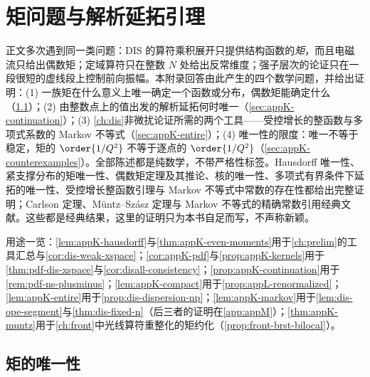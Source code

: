 \chapter{矩问题与解析延拓引理}\label{app:appK}

正文多次遇到同一类问题：DIS 的算符乘积展开只提供结构函数的\emph{矩}，而且电磁流只给出偶数矩；定域算符只在整数 $N$ 处给出反常维度；强子层次的论证只在一段很短的虚线段上控制前向振幅。本附录回答由此产生的四个数学问题，并给出证明：(1) 一族矩在什么意义上唯一确定一个函数或分布，偶数矩能确定什么（\cref{sec:appK-hausdorff}）；(2) 由整数点上的值出发的解析延拓何时唯一（\cref{sec:appK-continuation}）；(3) \cref{ch:dis}非微扰论证所需的两个工具——受控增长的整函数与多项式系数的 Markov 不等式（\cref{sec:appK-entire}）；(4) 唯一性的限度：唯一不等于稳定，矩的 $\order{1/Q^2}$ 不等于逐点的 $\order{1/Q^2}$（\cref{sec:appK-counterexamples}）。全部陈述都是纯数学，不带严格性标签。Hausdorff 唯一性、紧支撑分布的矩唯一性、偶数矩定理及其推论、核的唯一性、多项式有界条件下延拓的唯一性、受控增长整函数引理与 Markov 不等式中常数的存在性都给出完整证明；Carlson 定理、Müntz--Szász 定理与 Markov 不等式的精确常数引用经典文献。这些都是经典结果，这里的证明只为本书自足而写，不声称新颖。

用途一览：\cref{lem:appK-hausdorff}与\cref{thm:appK-even-moments}用于\cref{ch:prelim}的工具汇总与\cref{cor:dis-weak-xspace}；\cref{cor:appK-pdf}与\cref{prop:appK-kernels}用于\cref{thm:pdf-dis-xspace}与\cref{cor:disall-consistency}；\cref{prop:appK-continuation}用于\cref{rem:pdf-ns-plusminus}；\cref{lem:appK-compact}用于\cref{prop:appL-renormalized}；\cref{lem:appK-entire}用于\cref{prop:dis-dispersion-np}；\cref{lem:appK-markov}用于\cref{lem:dis-ope-segment}与\cref{thm:dis-fixed-n}（后三者的证明在\cref{app:appM}）；\cref{thm:appK-muntz}用于\cref{ch:front}中光线算符重整化的矩约化（\cref{prop:front-brst-bilocal}）。

\section{矩的唯一性}\label{sec:appK-hausdorff}

